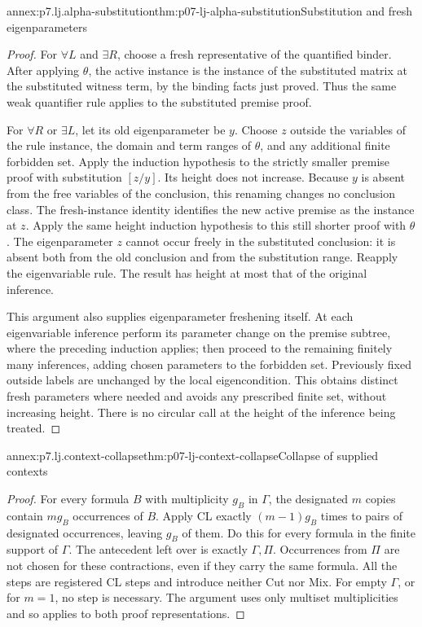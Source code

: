 \begin{annexitem}{annex:p7.lj.alpha-substitution}{thm:p07-lj-alpha-substitution}{Substitution and fresh eigenparameters}
\begin{proof}
For \(\forall L\) and \(\exists R\), choose a fresh representative
of the quantified binder.  After applying \(\theta\), the active
instance is the instance of the substituted matrix at the substituted
witness term, by the binding facts just proved.  Thus the same weak
quantifier rule applies to the substituted premise proof.

For \(\forall R\) or \(\exists L\), let its old eigenparameter be
\(y\).  Choose \(z\) outside the variables of the rule instance, the
domain and term ranges of \(\theta\), and any additional finite
forbidden set.  Apply the induction hypothesis to the strictly smaller
premise proof with substitution \([z/y]\).  Its height does not increase.
Because \(y\) is absent from the free variables of the conclusion,
this renaming changes no conclusion class.  The fresh-instance identity
identifies the new active premise as the instance at \(z\).  Apply the
same height induction hypothesis to this still shorter proof with
\(\theta\).  The eigenparameter \(z\) cannot occur freely in the
substituted conclusion: it is absent both from the old conclusion and
from the substitution range.  Reapply the eigenvariable rule.  The
result has height at most that of the original inference.

This argument also supplies eigenparameter freshening itself.  At each
eigenvariable inference perform its parameter change on the premise
subtree, where the preceding induction applies; then proceed to the
remaining finitely many inferences, adding chosen parameters to the
forbidden set.  Previously fixed outside labels are unchanged by the
local eigencondition.  This obtains distinct fresh parameters where
needed and avoids any prescribed finite set, without increasing height.
There is no circular call at the height of the inference being treated.
\end{proof}
\end{annexitem}

\begin{annexitem}{annex:p7.lj.context-collapse}{thm:p07-lj-context-collapse}{Collapse of supplied contexts}
\begin{proof}
For every formula \(B\) with multiplicity \(g_B\) in \(\Gamma\),
the designated \(m\) copies contain \(mg_B\) occurrences of \(B\).
Apply CL exactly \((m-1)g_B\) times to pairs of designated occurrences,
leaving \(g_B\) of them.  Do this for every formula in the finite support
of \(\Gamma\).  The antecedent left over is exactly
\(\Gamma,\Pi\).  Occurrences from \(\Pi\) are not chosen for these
contractions, even if they carry the same formula.  All the steps are
registered CL steps and introduce neither Cut nor Mix.  For empty
\(\Gamma\), or for \(m=1\), no step is necessary.  The argument uses
only multiset multiplicities and so applies to both proof representations.
\end{proof}
\end{annexitem}

